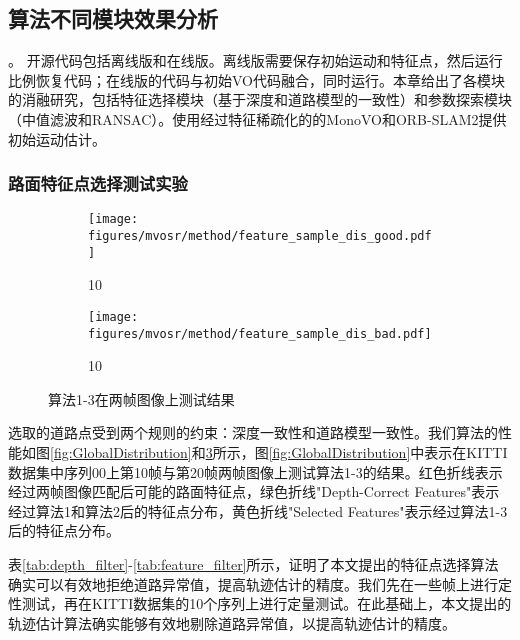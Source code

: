 \subsection{算法不同模块效果分析}
\label{sec:ablation}。
开源代码包括离线版和在线版。离线版需要保存初始运动和特征点，然后运行比例恢复代码；在线版的代码与初始VO代码融合，同时运行。本章给出了各模块的消融研究，包括特征选择模块（基于深度和道路模型的一致性）和参数探索模块（中值滤波和RANSAC）。使用经过特征稀疏化的的MonoVO和ORB-SLAM2提供初始运动估计。
\subsubsection{路面特征点选择测试实验}
\label{sec:FilterNecessrity}
\begin{figure}[t]
 \centering
\begin{subfigure}[b]{0.44\textwidth}
    \texttt{[image: figures/mvosr/method/feature\_sample\_dis\_good.pdf]}
\caption{10}
\label{fig:FeaturesDistribution_a}
\end{subfigure}  
\begin{subfigure}[b]{0.44\textwidth}
    \texttt{[image: figures/mvosr/method/feature\_sample\_dis\_bad.pdf]}
\caption{10}
\label{fig:FeaturesDistribution_b}
\end{subfigure}  
\caption{算法1-3在两帧图像上测试结果} %
\label{fig:FeaturesDistribution}
\end{figure}

选取的道路点受到两个规则的约束：深度一致性和道路模型一致性。我们算法的性能如图\ref{fig:GlobalDistribution}和\ref{fig:FeaturesDistribution}所示，图\ref{fig:GlobalDistribution}中表示在KITTI数据集中序列00上第10帧与第20帧两帧图像上测试算法1-3的结果。红色折线表示经过两帧图像匹配后可能的路面特征点，绿色折线"Depth-Correct Features"表示经过算法1和算法2后的特征点分布，黄色折线"Selected Features"表示经过算法1-3后的特征点分布。

表\ref{tab:depth_filter}-\ref{tab:feature_filter}所示，证明了本文提出的特征点选择算法确实可以有效地拒绝道路异常值，提高轨迹估计的精度。我们先在一些帧上进行定性测试，再在KITTI数据集的10个序列上进行定量测试。在此基础上，本文提出的轨迹估计算法确实能够有效地剔除道路异常值，以提高轨迹估计的精度。

